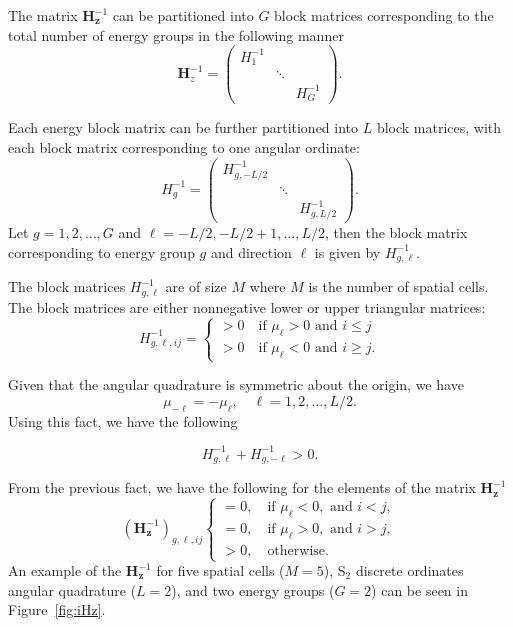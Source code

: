 The matrix $\mathbf{H}_\mathbf{z}^{-1}$ can be partitioned into $G$ block matrices corresponding to the total number of energy groups in the following manner
\begin{equation}
	\mathbf{H}_{z}^{-1} = \begin{pmatrix}
						H_{1}^{-1} & & \\
						& \ddots & \\
						& & H_{G}^{-1} 
					\end{pmatrix}.
\end{equation}

Each energy block matrix can be further partitioned into $L$ block matrices, with each block matrix corresponding to one angular ordinate:
\begin{equation}
	H_{g}^{-1} = \begin{pmatrix}
						H_{g,-L/2}^{-1} & & \\
						& \ddots & \\
						& & H_{g,L/2}^{-1} 
					\end{pmatrix}.
\end{equation}
Let $g = 1, 2, \dots, G$ and $\ell = -L/2, -L/2+1, \dots, L/2$, then the block matrix corresponding to energy group $g$ and direction $\ell$ is given by $H^{-1}_{g,\ell}$.

The block matrices $H^{-1}_{g,\ell}$ are of size $M$ where $M$ is the number of spatial cells. The block matrices are either nonnegative lower or upper triangular matrices:
\begin{equation}
	H^{-1}_{g,\ell,ij} = \begin{cases}
					> 0 \quad \text{if } \mu_{\ell} > 0 \text{ and } i \leq j \\
					> 0 \quad \text{if } \mu_{\ell} < 0 \text{ and } i \geq j.
				\end{cases}
\end{equation}

Given that the angular quadrature is symmetric about the origin, we have
\begin{equation}
	\mu_{-\ell} = -\mu_{\ell}, \quad \ell = 1, 2, \dots, L/2.
\end{equation}
Using this fact, we have the following
\begin{lemma}
\label{lemma:ell}
\begin{equation}
	H_{g,\ell}^{-1} + H_{g,-\ell}^{-1} > 0.
\end{equation}
\end{lemma}
From the previous fact, we have the following for the elements of the matrix $\mathbf{H}_{\mathbf{z}}^{-1}$
\begin{equation}
		(\mathbf{H}_{\mathbf{z}}^{-1})_{g,\ell, ij}
	\begin{cases}
 		= 0, \quad \text{if } \mu_{\ell} < 0, \text{ and } i < j, \\
 		= 0, \quad \text{if } \mu_{\ell} > 0, \text{ and } i > j, \\
		> 0, \quad \text{otherwise.}
	\end{cases}
\end{equation}
An example of the $\mathbf{H}_{\mathbf{z}}^{-1}$ for five spatial cells ($M=5$), S$_{2}$ discrete ordinates angular quadrature ($L=2$), and two energy groups ($G=2$) can be seen in Figure~\ref{fig:iHz}.

